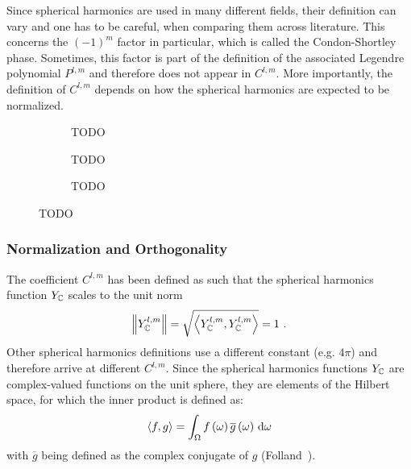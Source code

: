 Since spherical harmonics are used in many different fields, their definition can vary and one has to be careful, when comparing them across literature. This concerns the $(-1)^m$ factor in particular, which is called the Condon-Shortley phase. Sometimes, this factor is part of the definition of the associated Legendre polynomial $P^{l,m}$ and therefore does not appear in $C^{l,m}$. More importantly, the definition of $C^{l,m}$ depends on how the spherical harmonics are expected to be normalized.
\begin{figure}[h]
\centering
\begin{subfigure}{0.31\columnwidth}
\caption{TODO}
\label{fig:sh_vis_1}
\end{subfigure}
\hspace{0.01\columnwidth}
\begin{subfigure}{0.31\columnwidth}
\caption{TODO}
\label{fig:sh_vis_2}
\end{subfigure}
\hspace{0.01\columnwidth}
\begin{subfigure}{0.31\columnwidth}
\caption{TODO}
\label{fig:sh_vis_3}
\end{subfigure}%
\caption{TODO}
\label{fig:sh_vis}
\end{figure}

\subsubsection*{Normalization and Orthogonality}

The coefficient $C^{l,m}$ has been defined as such that the spherical harmonics function $Y_{\mathbb{C}}$ scales to the unit norm
\begin{align}
\label{eq:sh_normalization}
\left\lVert Y_{\mathbb{C}}^{l,m}\right\rVert = \sqrt{\left<Y_{\mathbb{C}}^{l,m}, Y_{\mathbb{C}}^{l,m}\right>} = 1
\ .
\end{align}
Other spherical harmonics definitions use a different constant (e.g. $4\pi$) and therefore arrive at different $C^{l,m}$. Since the spherical harmonics functions $Y_{\mathbb{C}}$ are complex-valued functions on the unit sphere, they are elements of the Hilbert space, for which the inner product is defined as:
\begin{align}
\label{eq:sh_inner_product}
\left<f,g\right> = \int_\Omega f\left(\omega\right)\overline{g}\left(\omega\right)\,\mathrm{d}\omega
\end{align}
with $\overline{g}$ being defined as the complex conjugate of $g$ (Folland~\cite{Folland92}).

